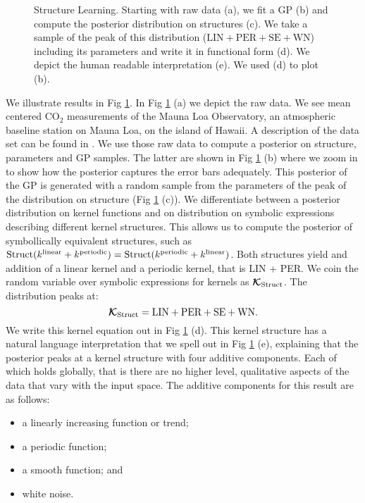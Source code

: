 \begin{figure}
\centering

\caption{\small Structure Learning. Starting with raw data (a), we fit a \ac{GP}
(b) and compute the posterior distribution on structures (c). We take a sample
of the peak of this distribution ($\text{LIN}+\text{PER}+\text{SE}+\text{WN}$)
including its parameters and write it in functional form (d). We depict the
human readable interpretation (e). We used (d) to plot (b).}\label{fig:posterior}
\end{figure}
We illustrate results in Fig \ref{fig:posterior}. In Fig \ref{fig:posterior} (a) we depict the raw data. 
We see mean centered CO$_2$ measurements of the Mauna Loa Observatory, an atmospheric
baseline station on Mauna Loa, on the island of Hawaii. 
A description of the data set  can be found in  \citealp[][chapter 5]{rasmussen2006gaussian}.  
We use those raw data to compute a posterior on structure, parameters and \ac{GP}
samples.
The latter are shown in  Fig \ref{fig:posterior} (b)
where we zoom in to show how the posterior captures the error bars
adequately.
This posterior of the \ac{GP} is generated with a random sample from the parameters
of the peak of the distribution on structure (Fig \ref{fig:posterior} (c)).
We differentiate between a posterior distribution on kernel functions and on
distribution on symbolic expressions describing different kernel structures. 
This allows us to compute the posterior of symbollically equivalent structures,
such as $\text{Struct}(k^\text{linear} + k^\text{periodic})=\text{Struct}(k^\text{periodic} + k^\text{linear})$. Both structures yield and addition of a linear kernel and a periodic kernel, that is LIN + PER.
We coin the random variable over symbolic expressions for kernels as $\bm{\mathcal{K}}_\text{Struct}$.
The distribution peaks at:
\begin{equation}
\bm{\mathcal{K}}_\text{Struct}=\text{LIN} + \text{PER} + \text{SE} + \text{WN}.
\end{equation}
We write this kernel equation out in Fig \ref{fig:posterior} (d).
This kernel structure has a natural language interpretation that we spell out in
Fig \ref{fig:posterior} (e), explaining that 
the posterior peaks at a kernel structure with four additive components.
Each of which holds globally, that is there are no higher level, qualitative aspects
of the data that vary with the input space. The additive components for this result are as follows:
\begin{itemize}
\item a linearly increasing function or trend; 
\item a periodic function;
\item a smooth function; and
\item white noise.
\end{itemize}
 



